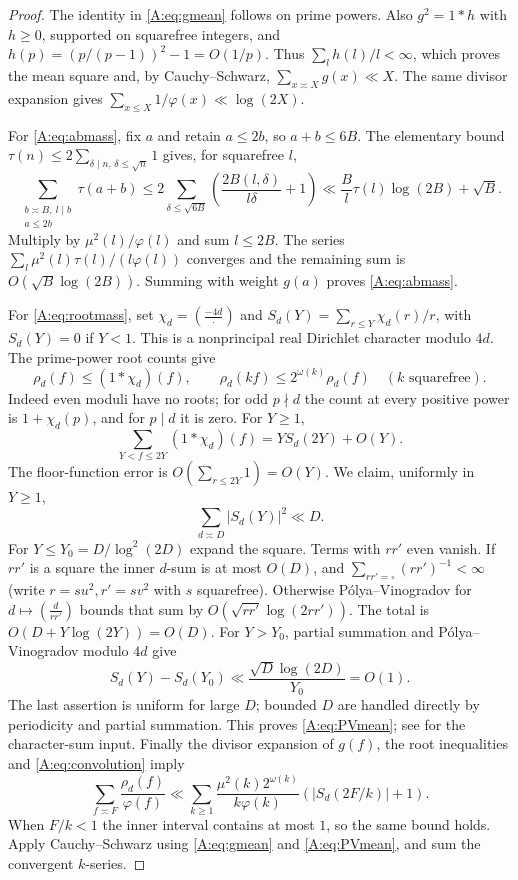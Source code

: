 \begin{proof}
The identity in \eqref{A:eq:gmean} follows on prime powers. Also
$g^2=1*h$ with $h\ge0$, supported on squarefree integers, and
$h(p)=(p/(p-1))^2-1=O(1/p)$. Thus $\sum_lh(l)/l<\infty$, which proves
the mean square and, by Cauchy--Schwarz, $\sum_{x\asymp X}g(x)\ll X$.
The same divisor expansion gives $\sum_{x\le X}1/\varphi(x)\ll\log(2X)$.

For \eqref{A:eq:abmass}, fix $a$ and retain $a\le2b$, so $a+b\le6B$.
The elementary bound $\tau(n)\le2\sum_{\delta\mid n,\,\delta\le\sqrt n}1$
gives, for squarefree $l$,
\[
 \sum_{\substack{b\asymp B,\ l\mid b\\a\le2b}}\tau(a+b)
 \le2\sum_{\delta\le\sqrt{6B}}
       \left(\frac{2B(l,\delta)}{l\delta}+1\right)
 \ll\frac B l\tau(l)\log(2B)+\sqrt B.
\]
Multiply by $\mu^2(l)/\varphi(l)$ and sum $l\le2B$.
The series $\sum_l\mu^2(l)\tau(l)/(l\varphi(l))$ converges and the
remaining sum is $O(\sqrt B\log(2B))$. Summing with weight $g(a)$ proves
\eqref{A:eq:abmass}.

For \eqref{A:eq:rootmass}, set $\chi_d=(\frac{-4d}{\cdot})$ and
$S_d(Y)=\sum_{r\le Y}\chi_d(r)/r$, with $S_d(Y)=0$ if $Y<1$.
This is a nonprincipal real Dirichlet character modulo $4d$.
The prime-power root counts give
\[
 \rho_d(f)\le(1*\chi_d)(f),\qquad
 \rho_d(kf)\le2^{\omega(k)}\rho_d(f)\quad(k\text{ squarefree}).
\]
Indeed even moduli have no roots; for odd $p\nmid d$ the count at every
positive power is $1+\chi_d(p)$, and for $p\mid d$ it is zero.
For $Y\ge1$,
\begin{equation}\label{A:eq:convolution}
 \sum_{Y<f\le2Y}(1*\chi_d)(f)=Y S_d(2Y)+O(Y).
\end{equation}
The floor-function error is $O(\sum_{r\le2Y}1)=O(Y)$.
We claim, uniformly in $Y\ge1$,
\begin{equation}\label{A:eq:PVmean}
 \sum_{d\asymp D}|S_d(Y)|^2\ll D.
\end{equation}
For $Y\le Y_0=D/\log^2(2D)$ expand the square. Terms with $rr'$ even
vanish. If $rr'$ is a square the inner $d$-sum is at most $O(D)$, and
$\sum_{rr'=\square}(rr')^{-1}<\infty$ (write $r=su^2,r'=sv^2$ with $s$
squarefree). Otherwise P\'olya--Vinogradov for
$d\mapsto(\frac d{rr'})$ bounds that sum by
$O(\sqrt{rr'}\log(2rr'))$. The total is
$O(D+Y\log(2Y))=O(D)$. For $Y>Y_0$, partial summation and
P\'olya--Vinogradov modulo $4d$ give
\[
 S_d(Y)-S_d(Y_0)\ll\frac{\sqrt D\log(2D)}{Y_0}=O(1).
\]
The last assertion is uniform for large $D$; bounded $D$ are handled
directly by periodicity and partial summation. This proves
\eqref{A:eq:PVmean}; see \cite[Chapter~12]{IK} for the character-sum input.
Finally the divisor expansion of $g(f)$, the root inequalities and
\eqref{A:eq:convolution} imply
\[
 \sum_{f\asymp F}\frac{\rho_d(f)}{\varphi(f)}
 \ll\sum_{k\ge1}\frac{\mu^2(k)2^{\omega(k)}}{k\varphi(k)}
                 (|S_d(2F/k)|+1).
\]
When $F/k<1$ the inner interval contains at most $1$, so the same bound
holds. Apply Cauchy--Schwarz using \eqref{A:eq:gmean} and
\eqref{A:eq:PVmean}, and sum the convergent $k$-series.
\end{proof}


